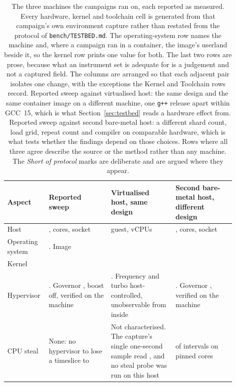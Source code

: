 \documentclass[english,oneside,a4paper,censored,csm,software-track-2020]{HYthesisML}
\begin{document}
\begin{appendices}
\begin{table}[tp]
\centering
\small
\caption[The three measurement hosts]{The three machines the campaigns ran on, each reported as
measured. Every hardware, kernel and toolchain cell is generated from that campaign's own
environment capture rather than restated from the protocol of \texttt{bench/TESTBED.md}. The
operating-system row names the machine and, where a campaign ran in a container, the image's
userland beside it, so the kernel row prints one value for both. The last
two rows are prose, because what an instrument set is adequate for is a judgement and not a captured
field. The columns are arranged so that each
adjacent pair isolates one change, with the exceptions the Kernel and Toolchain rows record.
Reported sweep against virtualised host: the same design and the same container image on a
different machine, one \texttt{g++} release apart within GCC~15, which is what
Section~\ref{sec:testbed} reads a hardware effect from.
Reported sweep against second bare-metal host: a different shard count, load grid, repeat count and
compiler on comparable hardware, which is what tests whether the findings depend on those choices.
Rows where all three agree describe the source or the method rather than any machine. The
\emph{Short of protocol} marks are deliberate and are argued where they appear.\label{tab:testbed}}
\renewcommand{\arraystretch}{1.1}
\footnotesize
\begin{tabular}{@{}R{0.14\linewidth} R{0.26\linewidth} R{0.27\linewidth} R{0.25\linewidth}@{}}
\hline\hline
Aspect & Reported sweep & Virtualised host, same design & Second bare-metal host, different design \\
\hline
Host & \MainCpu{}, \MainCores{} cores, \MainSockets{} socket & \GuestCpu{} guest, \GuestCores{} vCPUs & \BmCpu{}, \BmCores{} cores, \BmSockets{} socket \\
Operating system & \MainHostDistro{}. Image \MainDistro{} & \GuestDistro{} & \BmDistro{} \\
Kernel & \MainKernel{} & \GuestKernel{} & \BmKernel{} \\
Hypervisor & \MainVirt{}. Governor \MainGovernor{}, boost off, verified on the machine & \GuestVirt{}. Frequency and turbo host-controlled, unobservable from inside & \BmVirt{}. Governor \BmGovernor{}, verified on the machine \\
CPU steal & None: no hypervisor to lose a timeslice to & Not characterised. The capture's single one-second sample read \GuestSteal{}, and no steal probe was run on this host & \BmStealWithSteal{} of \BmStealIntervals{} intervals on \BmStealCores{} pinned cores \\

\end{tabular}
\end{table}
\end{appendices}
\end{document}
